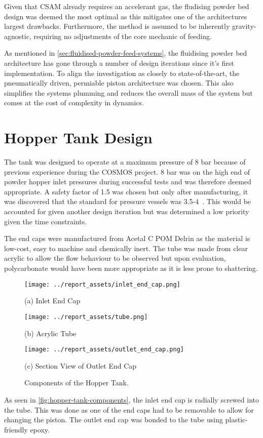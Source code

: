 Given that CSAM already requires an accelerant gas, the fludising powder bed design was deemed the most optimal as this mitigates one of the architectures largest drawbacks. Furthermore, the method is assumed to be inherently gravity-agnostic, requiring no adjustments of the core mechanic of feeding. 

As mentioned in \autoref{sec:fluidised-powder-feed-systems}, the fluidising powder bed architecture has gone through a number of design iterations since it's first implementation. To align the investigation as closely to state-of-the-art, the pneumatically driven, permiable piston architecture was chosen. This also simplifies the systems plumming and reduces the overall mass of the system but comes at the cost of complexity in dynamics.
\newpage
\section{Hopper Tank Design}
The tank was designed to operate at a maximum pressure of 8 bar because of previous experience during the COSMOS project. 8 bar was on the high end of powder hopper inlet pressures during successful tests and was therefore deemed appropriate. A safety factor of 1.5 was chosen but only after manufacturing, it was discovered that the standard for pressure vessels was 3.5-4~\cite{redriver2024asme}. This would be accounted for given another design iteration but was determined a low priority given the time constraints.

The end caps were manufactured from Acetal C POM Delrin as the material is low-cost, easy to machine and chemically inert. The tube was made from clear acrylic to allow the flow behaviour to be observed but upon evaluation, polycarbonate would have been more appropriate as it is less prone to shattering.
\begin{figure}[htbp]
    \centering

    \begin{minipage}{0.3\textwidth}
        \centering
        \texttt{[image: ../report\_assets/inlet\_end\_cap.png]}
        \caption*{(a) Inlet End Cap}
    \end{minipage}
    \hfill
    \begin{minipage}{0.3\textwidth}
        \centering
        \texttt{[image: ../report\_assets/tube.png]}
        \caption*{(b) Acrylic Tube}
    \end{minipage}
    \hfill
    \begin{minipage}{0.3\textwidth}
        \centering
        \texttt{[image: ../report\_assets/outlet\_end\_cap.png]}
        \caption*{(c) Section View of Outlet End Cap}
    \end{minipage}
    \caption{Components of the Hopper Tank.}\label{fig:hopper-tank-components}
\end{figure}
As seen in \autoref{fig:hopper-tank-components}, the inlet end cap is radially screwed into the tube. This was done as one of the end caps had to be removable to allow for changing the piston. The outlet end cap was bonded to the tube using plastic-friendly epoxy.

